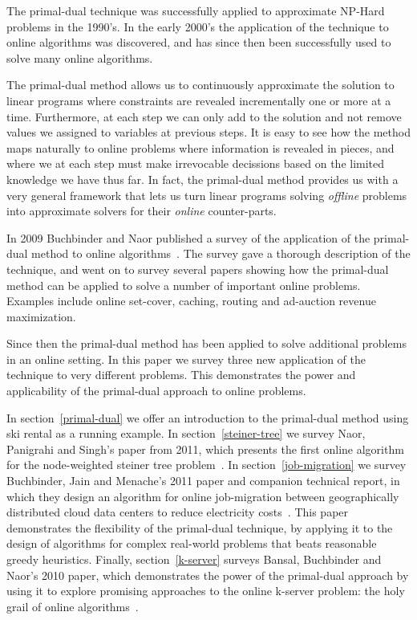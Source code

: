 The primal-dual technique was successfully applied to approximate NP-Hard problems in the 1990's.
In the early 2000's the application of the technique to online algorithms was discovered, and has since then been successfully used to solve many online algorithms.

The primal-dual method allows us to continuously approximate the solution to linear programs where constraints are revealed incrementally one or more at a time. 
Furthermore, at each step we can only add to the solution and not remove values we assigned to variables at previous steps.
It is easy to see how the method maps naturally to online problems where information is revealed in pieces, and where we at each step must make irrevocable decissions based on the limited knowledge we have thus far.
In fact, the primal-dual method provides us with a very general framework that lets us turn linear programs solving \emph{offline} problems into approximate solvers for their \emph{online} counter-parts.

In 2009 Buchbinder and Naor published a survey of the application of the primal-dual method to online algorithms~\cite{buchbinder09:survey}.
The survey gave a thorough description of the technique, and went on to survey several papers showing how the primal-dual method can be applied to solve a number of important online problems. 
Examples include online set-cover, caching, routing and ad-auction revenue maximization.

Since then the primal-dual method has been applied to solve additional problems in an online setting.
In this paper we survey three new application of the technique to very different problems.
This demonstrates the power and applicability of the primal-dual approach to online problems.

In section~\ref{primal-dual} we offer an introduction to the primal-dual method using ski rental as a running example.
In section~\ref{steiner-tree} we survey Naor, Panigrahi and Singh's paper from 2011, which presents the first online algorithm for the node-weighted steiner tree problem~\cite{naor11:node-weighted-steiner-tree}.
In section~\ref{job-migration} we survey Buchbinder, Jain and Menache's 2011 paper and companion technical report, in which they design an algorithm for online job-migration between geographically distributed cloud data centers to reduce electricity costs~\cite{buchbinder11:job-migration,buchbinder11:job-migration-techreport}.
This paper demonstrates the flexibility of the primal-dual technique, by applying it to the design of algorithms for complex real-world problems that beats reasonable greedy heuristics.
Finally, section~\ref{k-server} surveys Bansal, Buchbinder and Naor's 2010 paper, which demonstrates the power of the primal-dual approach by using it to explore promising approaches to the online k-server problem: the holy grail of online algorithms~\cite{bansal10:k-server}.
